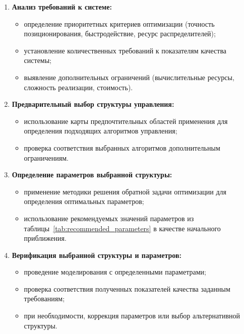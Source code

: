 \begin{enumerate}
	\item \textbf{Анализ требований к системе:}
	      \begin{itemize}
		      \item определение приоритетных критериев оптимизации (точность позиционирования,
		            быстродействие, ресурс распределителей);
		      \item установление количественных требований к показателям качества системы;
		      \item выявление дополнительных ограничений (вычислительные ресурсы, сложность реализации, стоимость).
	      \end{itemize}

	\item \textbf{Предварительный выбор структуры управления:}
	      \begin{itemize}
		      \item использование карты предпочтительных областей применения для определения
		            подходящих алгоритмов управления;
		      \item проверка соответствия выбранных алгоритмов дополнительным ограничениям.
	      \end{itemize}

	\item \textbf{Определение параметров выбранной структуры:}
	      \begin{itemize}
		      \item применение методики решения обратной задачи оптимизации для определения
		            оптимальных параметров;
		      \item использование рекомендуемых значений параметров из таблицы~\ref{tab:recommended_parameters}
		            в качестве начального приближения.
	      \end{itemize}

	\item \textbf{Верификация выбранной структуры и параметров:}
	      \begin{itemize}
		      \item проведение моделирования с определенными параметрами;
		      \item проверка соответствия полученных показателей качества заданным требованиям;
		      \item при необходимости, коррекция параметров или выбор альтернативной структуры.
	      \end{itemize}
\end{enumerate}
